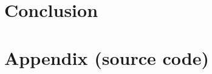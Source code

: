 \documentclass[a4paper,10pt]{article}
\begin{document}
	
	\section{Conclusion} 
	
	
	
	\newpage
	
	\section{Appendix (source code)}
	
	
	\begin{comment}
	Hvis Fern Time er lavet tilføjes det her og begin og end comment skal fjernes. 
	\textbf{Fern program}
	
	
	\end{comment}
	
\end{document}
